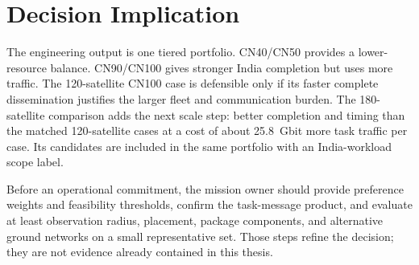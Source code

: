 \section{Decision Implication}

The engineering output is one tiered portfolio. CN40/CN50 provides a lower-resource balance. CN90/CN100 gives stronger India completion but uses more traffic. The 120-satellite CN100 case is defensible only if its faster complete dissemination justifies the larger fleet and communication burden. The 180-satellite comparison adds the next scale step: better completion and timing than the matched 120-satellite cases at a cost of about 25.8~Gbit more task traffic per case. Its candidates are included in the same portfolio with an India-workload scope label.

Before an operational commitment, the mission owner should provide preference weights and feasibility thresholds, confirm the task-message product, and evaluate at least observation radius, placement, package components, and alternative ground networks on a small representative set. Those steps refine the decision; they are not evidence already contained in this thesis.
